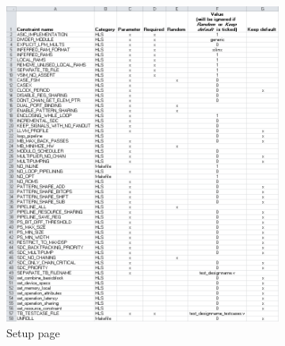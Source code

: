 \begin{figure}
        \centering
        \begin{subfigure}{0.66\textwidth}\centering%
                    \includegraphics[width=\linewidth]{../figs/ConstraintGenerationSetup.png}
                \caption{Setup page}
  \label{fig:excelconstraintssetup}
       \end{subfigure}%
    \hfill
        \begin{subfigure}{0.32\textwidth}\centering

\end{subfigure}
\end{figure}
